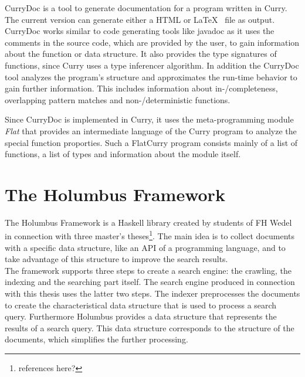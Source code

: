 \documentclass[%
	pdftex,%
	a4paper,%
	oneside,%
	chapterprefix,%
	headsepline,%
	12pt%
]{scrbook}
\begin{document}
CurryDoc is a tool to generate documentation for a program written in
Curry. The current version can generate either a HTML or \LaTeX~ file
as output. CurryDoc works similar to code generating tools like
javadoc\cite{javadoc} as it uses the comments in the source code, which
are provided by the user, to gain information about the function or
data structure. It also provides the type signatures of functions,
since Curry uses a type inferencer algorithm. In addition the CurryDoc tool
analyzes the program's structure and approximates the run-time
behavior to gain further information\cite{currydoc2}. This includes information about
in-/completeness, overlapping pattern matches and non-/deterministic
functions.

Since CurryDoc is implemented in Curry, it uses the meta-programming
module \emph{Flat}\cite{flat2} that provides an intermediate language of the Curry
program to analyze the special function proporties. Such a
FlatCurry\cite{flat} program consists mainly of a list of functions, a
list of types and information about the module itself.


\section{The Holumbus Framework}\label{preliminaries:holumbus}
The Holumbus Framework is a Haskell library created by students of FH
Wedel in connection with three master's theses\footnote{references here?}. The main idea is to
collect documents with a specific data structure, like an API of a
programming language, and to take advantage of this structure to
improve the search results.\\

The framework supports three steps to create a search engine: the
crawling, the indexing and the searching part itself. The search
engine produced in connection with this thesis uses the latter two steps. The
indexer preprocesses the documents to create the characteristical data
structure that is used to process a search query. Furthermore Holumbus
provides a data structure that represents the results of a search
query. This data structure corresponds to the structure of the
documents, which simplifies the further processing.
\end{document}
